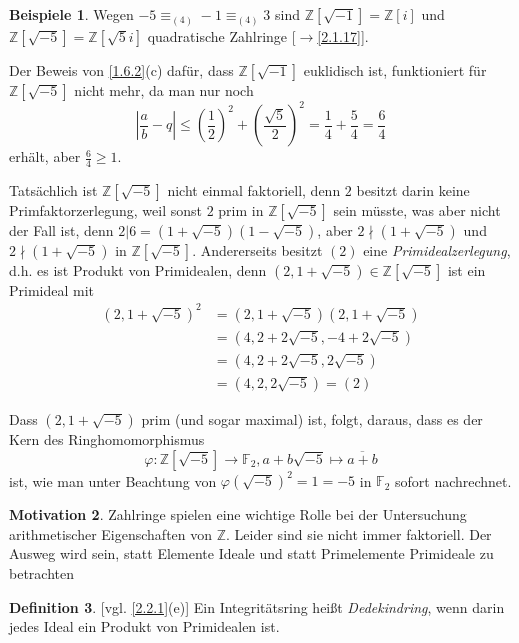 \documentclass[
twoside=semi,
fontsize=12,
DIV=12, 
cleardoublepage=current,
leqno,
headings=optiontoheadandtoc, 
toc=idx
]{scrbook}
\newcommand{\Z}{\mathbb{Z}}
\newcommand{\F}{\mathbb{F}}
\newcommand{\brac}[1]{\left( #1 \right)}
\theoremstyle{definition}
\newtheorem{definition}{Definition}[section]
\newtheorem{beispiele}[definition]{Beispiele}
\newtheorem{motivation}[definition]{Motivation}
\begin{document}
 	\begin{beispiele}\label{2.2.2}
 		Wegen $-5 \equiv_{(4)} -1 \equiv_{(4)} 3$ sind $\Z[\sqrt{-1}] = \Z[i]$ und $\Z[\sqrt{-5}] = \Z[\sqrt{5}i]$ quadratische Zahlringe [$\to$\ref{2.1.17}].
 		
 		Der Beweis von \ref{1.6.2}(c) daf\"ur, dass $\Z[\sqrt{-1}]$ euklidisch ist, funktioniert f\"ur $\Z[\sqrt{-5}]$ nicht mehr, da man nur noch 
 			\[\left| \frac{a}{b} - q\right| \leq \brac{\frac{1}{2}}^2 + \brac{\frac{\sqrt{5}}{2}}^2 = \frac{1}{4} + \frac{5}{4} = \frac{6}{4}\]
 		erh\"alt, aber $\frac{6}{4} \geq 1$. 
 		
 		Tats\"achlich ist $\Z[\sqrt{-5}]$ nicht einmal faktoriell, denn $2$ besitzt darin keine Primfaktorzerlegung, weil sonst $2$ prim in $\Z[\sqrt{-5}]$ sein m\"usste, was aber nicht der Fall
 		ist, denn $2|6 = (1+\sqrt{-5})(1-\sqrt{-5})$, aber $2\nmid (1+\sqrt{-5})$ und $2 \nmid (1+\sqrt{-5})$ in $\Z[\sqrt{-5}]$. Andererseits besitzt $(2)$ eine \emph{Primidealzerlegung}, d.h. es ist Produkt von Primidealen, denn $(2,1+\sqrt{-5}) \in \Z[\sqrt{-5}]$ ist ein Primideal mit 
 		\begin{align*}
 			(2,1+\sqrt{-5})^2 &= (2,1+\sqrt{-5})(2,1+\sqrt{-5})\\
 			&= (4, 2 + 2\sqrt{-5}, -4 + 2\sqrt{-5})\\
 			&= (4, 2+2\sqrt{-5},2\sqrt{-5})\\
 			&= (4,2,2\sqrt{-5}) = (2)
 		\end{align*}
 	
 		Dass $(2,1+\sqrt{-5})$ prim (und sogar maximal) ist, folgt, daraus, dass es der Kern des Ringhomomorphismus
 			\[\varphi:\Z[\sqrt{-5}]\to \F_2, a+b\sqrt{-5} \mapsto \overline{a+b}\]
 		ist, wie man unter Beachtung von $\varphi(\sqrt{-5})^2 = 1 = -5$ in $\F_2$ sofort nachrechnet.
 	\end{beispiele}
 
 	\begin{motivation}\label{2.2.3}
 		Zahlringe spielen eine wichtige Rolle bei der Untersuchung arithmetischer Eigenschaften von $\Z$. Leider sind sie nicht immer faktoriell. Der Ausweg wird sein, statt Elemente Ideale und statt Primelemente Primideale zu betrachten
 	\end{motivation}
 
 	\begin{definition}\label{2.2.4}
 		[vgl. \ref{2.2.1}(e)]
 		Ein Integrit\"atsring hei\ss t \emph{Dedekindring}, wenn darin jedes Ideal ein Produkt von Primidealen ist.
 	\end{definition}
 
\end{document}
